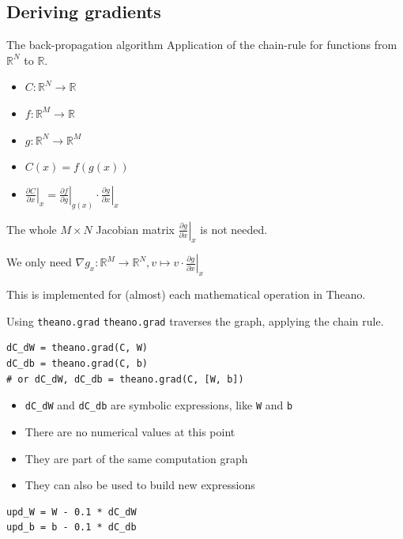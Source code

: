 \documentclass[a4paper,9pt]{beamer}
\begin{document}
\subsection{Deriving gradients}
\begin{frame}{The back-propagation algorithm}
  Application of the chain-rule for functions from ${\mathbb R}^N$ to ${\mathbb R}$.
  \begin{itemize}
    \item $C: {\mathbb R}^N \rightarrow {\mathbb R}$
    \item $f: {\mathbb R}^M \rightarrow {\mathbb R}$
    \item $g: {\mathbb R}^N \rightarrow {\mathbb R}^M$
    \item $C(x) = f(g(x))$
    \item $\left.\frac{\partial C}{\partial x}\right|_x =
              \left.\frac{\partial f}{\partial g}\right|_{g(x)}
              \cdot \left.\frac{\partial g}{\partial x}\right|_x$
  \end{itemize}
  The whole $M \times N$ Jacobian matrix $\left.\frac{\partial g}{\partial x}\right|_x$
  is not needed.

  We only need $\nabla g_x: {\mathbb R}^M \rightarrow {\mathbb R}^N, v \mapsto v \cdot \left.\frac{\partial g}{\partial x}\right|_x$

  This is implemented for (almost) each mathematical operation in Theano.
\end{frame}

\begin{frame}[fragile]{Using \texttt{theano.grad}}
\verb|theano.grad| traverses the graph, applying the chain rule.
  \begin{verbatim}
dC_dW = theano.grad(C, W)
dC_db = theano.grad(C, b)
# or dC_dW, dC_db = theano.grad(C, [W, b])
  \end{verbatim}
  \begin{itemize}
    \item \verb|dC_dW| and \verb|dC_db| are symbolic expressions, like \verb|W| and \verb|b|
    \item There are no numerical values at this point
    \item They are part of the same computation graph
    \item They can also be used to build new expressions
  \end{itemize}
  \begin{verbatim}
upd_W = W - 0.1 * dC_dW
upd_b = b - 0.1 * dC_db
  \end{verbatim}
\end{frame}
\end{document}
